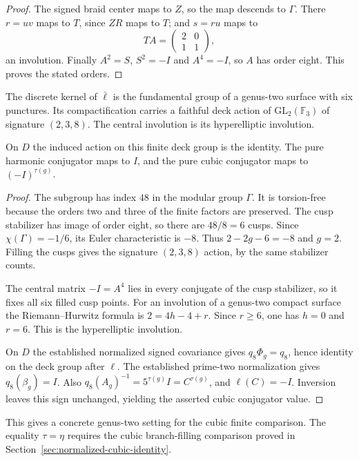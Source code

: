 \begin{proof}
The signed braid center maps to $Z$, so the map descends to
$\Gamma$.  There $r=uv$ maps to $T$, since $ZR$ maps to $T$;
and $s=ru$ maps to
\[
 TA=\begin{pmatrix}2&0\\1&1\end{pmatrix},
\]
an involution.  Finally $A^2=S$, $S^2=-I$ and $A^4=-I$,
so $A$ has order eight.  This proves the stated orders.
\end{proof}

\begin{corollary}\label{cor:genus-two-sign-cover}
The discrete kernel of $\bar\ell$ is the fundamental group of
a genus-two surface with six punctures.  Its compactification
carries a faithful deck action of $\mathrm{GL}_2(\mathbb F_3)$
of signature $(2,3,8)$.  The central involution is its
hyperelliptic involution.

On $D$ the induced action on this finite deck group is the
identity.  The pure harmonic conjugator maps to $I$, and the
pure cubic conjugator maps to $(-I)^{\tau(g)}$.
\end{corollary}
\begin{proof}
The subgroup has index $48$ in the modular group $\Gamma$.
It is torsion-free because the orders two and three of the
finite factors are preserved.  The cusp stabilizer has image
of order eight, so there are $48/8=6$ cusps.  Since
$\chi(\Gamma)=-1/6$, its Euler characteristic is $-8$.
Thus $2-2g-6=-8$ and $g=2$.  Filling the cusps gives the
signature $(2,3,8)$ action, by the same stabilizer counts.

The central matrix $-I=A^4$ lies in every conjugate of the
cusp stabilizer, so it fixes all six filled cusp points.
For an involution of a genus-two compact surface the
Riemann--Hurwitz formula is $2=4h-4+r$.  Since $r\geq6$,
one has $h=0$ and $r=6$.  This is the hyperelliptic involution.

On $D$ the established normalized signed covariance gives
$q_8\Phi_g=q_8$, hence identity on the deck group after $\ell$.
The established prime-two normalization gives
$q_8(\beta_g)=I$.  Also
$q_8(A_g)^{-1}=5^{\tau(g)}I=C^{\tau(g)}$, and
$\ell(C)=-I$.  Inversion leaves this sign unchanged, yielding
the asserted cubic conjugator value.
\end{proof}

This gives a concrete genus-two setting for the cubic finite
comparison. The equality $\tau=\eta$ requires the cubic branch-filling
comparison proved in Section~\ref{sec:normalized-cubic-identity}.

